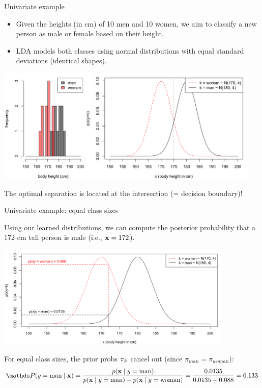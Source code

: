 \documentclass[11pt,compress,t,notes=noshow, xcolor=table]{beamer}
\begin{document}
\begin{vbframe}{Univariate example}
\begin{small}
\begin{itemize}
\item Given the heights (in cm) of 10 men and 10 women, we aim to classify a new person as male or female based on their height.
\item LDA models both classes using normal distributions with equal standard deviations (identical shapes).
\end{itemize}
\begin{center}
\includegraphics[width=0.95\textwidth, clip=true, trim={0 0 0 0}]{figure/disc_univariate-1.png}
\end{center}
\centerline{The optimal separation is located at the intersection (= decision boundary)!}
\end{small}
\end{vbframe}

\begin{vbframe}{Univariate example: equal class sizes}
\begin{small}
Using our learned distributions, we can compute the posterior probability that a 172 cm tall person is male (i.e., $\mathbf{x} = 172$).
\begin{center}
\includegraphics[width=0.85\textwidth, clip=true, trim={0 0 0 0}]{figure/disc_univariate-2.png}
\end{center}
For equal class sizes, the prior probs $\pi_{k}$ cancel out (since $\pi_{man} = \pi_{woman}$):
$$
\P(y = \text{man} \mid \xv) = \frac{p(\xv \mid y = \text{man})}{p(\xv \mid y = \text{man}) + p(\xv \mid y = \text{woman})} = \frac{0.0135}{0.0135 + 0.088} = 0.133
$$
\end{small}
\end{vbframe}
\end{document}
